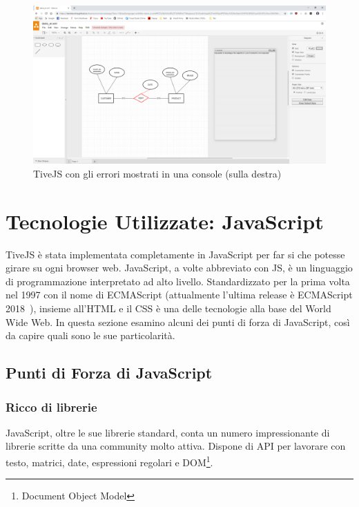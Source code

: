                 \begin{figure}[htbp]
                    \centering
                    \includegraphics[scale=0.20]{Figure/semanticTranslation_error.PNG}
                    \caption{TiveJS con gli errori mostrati in una console (sulla destra)}
                    \label{fig:semanticTranslation_error}
                \end{figure}

    \section{Tecnologie Utilizzate: JavaScript}
        TiveJS è stata implementata completamente in JavaScript per far si che potesse girare su ogni browser web.
        JavaScript, a volte abbreviato con JS, è un linguaggio di programmazione interpretato ad alto livello. Standardizzato per la prima volta nel 1997 con il nome di ECMAScript (attualmente l'ultima release è ECMAScript 2018~\cite{ecmascript}), insieme all'HTML e il CSS è una delle tecnologie alla base del World Wide Web.
        In questa sezione esamino alcuni dei punti di forza di JavaScript, così da capire quali sono le sue particolarità.

        \subsection{Punti di Forza di JavaScript}

            \subsubsection{Ricco di librerie}
                JavaScript, oltre le sue librerie standard, conta un numero impressionante di librerie scritte da una community molto attiva. Dispone di API per lavorare con testo, matrici, date, espressioni regolari e DOM\footnote{Document Object Model}.

